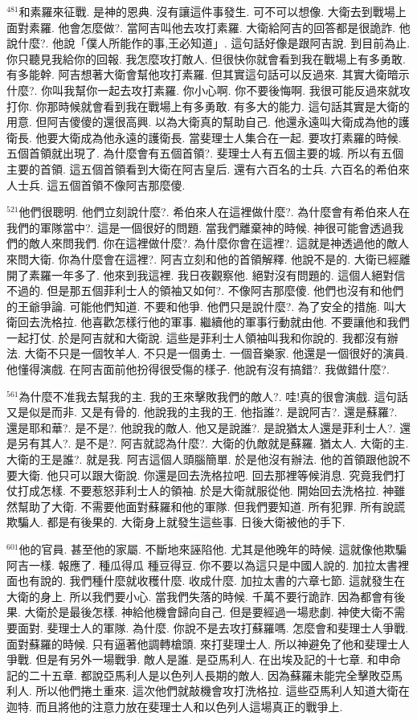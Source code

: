 \documentclass{book}
\begin{document}
$^{481}$和素羅來征戰.
是神的恩典.
沒有讓這件事發生.
可不可以想像.
大衛去到戰場上面對素羅.
他會怎麼做?.
當阿吉叫他去攻打素羅.
大衛給阿吉的回答都是很詭詐.
他說什麼?.
他說「僕人所能作的事,王必知道」.
這句話好像是跟阿吉說.
到目前為止.
你只聽見我給你的回報.
我怎麼攻打敵人.
但很快你就會看到我在戰場上有多勇敢.
有多能幹.
阿吉想著大衛會幫他攻打素羅.
但其實這句話可以反過來.
其實大衛暗示什麼?.
你叫我幫你一起去攻打素羅.
你小心啊.
你不要後悔啊.
我很可能反過來就攻打你.
你那時候就會看到我在戰場上有多勇敢.
有多大的能力.
這句話其實是大衛的用意.
但阿吉傻傻的還很高興.
以為大衛真的幫助自己.
他還永遠叫大衛成為他的護衛長.
他要大衛成為他永遠的護衛長.
當斐理士人集合在一起.
要攻打素羅的時候.
五個首領就出現了.
為什麼會有五個首領?.
斐理士人有五個主要的城.
所以有五個主要的首領.
這五個首領看到大衛在阿吉皇后.
還有六百名的士兵.
六百名的希伯來人士兵.
這五個首領不像阿吉那麼傻.

$^{521}$他們很聰明.
他們立刻說什麼?.
希伯來人在這裡做什麼?.
為什麼會有希伯來人在我們的軍隊當中?.
這是一個很好的問題.
當我們離棄神的時候.
神很可能會透過我們的敵人來問我們.
你在這裡做什麼?.
為什麼你會在這裡?.
這就是神透過他的敵人來問大衛.
你為什麼會在這裡?.
阿吉立刻和他的首領解釋.
他說不是的.
大衛已經離開了素羅一年多了.
他來到我這裡.
我日夜觀察他.
絕對沒有問題的.
這個人絕對信不過的.
但是那五個菲利士人的領袖又如何?.
不像阿吉那麼傻.
他們也沒有和他們的王爺爭論.
可能他們知道.
不要和他爭.
他們只是說什麼?.
為了安全的措施.
叫大衛回去洗格拉.
他喜歡怎樣行他的軍事.
繼續他的軍事行動就由他.
不要讓他和我們一起打仗.
於是阿吉就和大衛說.
這些是菲利士人領袖叫我和你說的.
我都沒有辦法.
大衛不只是一個牧羊人.
不只是一個勇士.
一個音樂家.
他還是一個很好的演員.
他懂得演戲.
在阿吉面前他扮得很受傷的樣子.
他說有沒有搞錯?.
我做錯什麼?.

$^{561}$為什麼不准我去幫我的主.
我的王來擊敗我們的敵人?.
哇!真的很會演戲.
這句話又是似是而非.
又是有骨的.
他說我的主我的王.
他指誰?.
是說阿吉?.
還是蘇羅?.
還是耶和華?.
是不是?.
他說我的敵人.
他又是說誰?.
是說猶太人還是菲利士人?.
還是另有其人?.
是不是?.
阿吉就認為什麼?.
大衛的仇敵就是蘇羅.
猶太人.
大衛的主.
大衛的王是誰?.
就是我.
阿吉這個人頭腦簡單.
於是他沒有辦法.
他的首領跟他說不要大衛.
他只可以跟大衛說.
你還是回去洗格拉吧.
回去那裡等候消息.
究竟我們打仗打成怎樣.
不要惹怒菲利士人的領袖.
於是大衛就服從他.
開始回去洗格拉.
神雖然幫助了大衛.
不需要他面對蘇羅和他的軍隊.
但我們要知道.
所有犯罪.
所有說謊欺騙人.
都是有後果的.
大衛身上就發生這些事.
日後大衛被他的手下.

$^{601}$他的官員.
甚至他的家屬.
不斷地來誣陷他.
尤其是他晚年的時候.
這就像他欺騙阿吉一樣.
報應了.
種瓜得瓜 種豆得豆.
你不要以為這只是中國人說的.
加拉太書裡面也有說的.
我們種什麼就收穫什麼.
收成什麼.
加拉太書的六章七節.
這就發生在大衛的身上.
所以我們要小心.
當我們失落的時候.
千萬不要行詭詐.
因為都會有後果.
大衛於是最後怎樣.
神給他機會歸向自己.
但是要經過一場悲劇.
神使大衛不需要面對.
斐理士人的軍隊.
為什麼.
你說不是去攻打蘇羅嗎.
怎麼會和斐理士人爭戰.
面對蘇羅的時候.
只有逼著他調轉槍頭.
來打斐理士人.
所以神避免了他和斐理士人爭戰.
但是有另外一場戰爭.
敵人是誰.
是亞馬利人.
在出埃及記的十七章.
和申命記的二十五章.
都說亞馬利人是以色列人長期的敵人.
因為蘇羅未能完全擊敗亞馬利人.
所以他們捲土重來.
這次他們就敲機會攻打洗格拉.
這些亞馬利人知道大衛在迦特.
而且將他的注意力放在斐理士人和以色列人這場真正的戰爭上.
\end{document}
